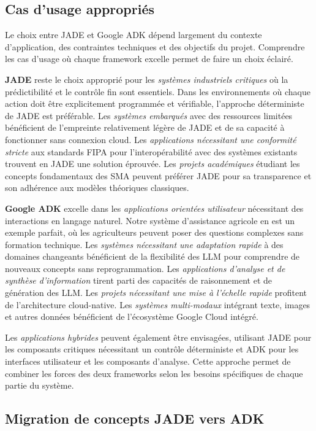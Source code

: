 \subsection{Cas d'usage appropriés}

Le choix entre JADE et Google ADK dépend largement du contexte d'application, des contraintes techniques et des objectifs du projet. Comprendre les cas d'usage où chaque framework excelle permet de faire un choix éclairé.

\textbf{JADE} reste le choix approprié pour les \emph{systèmes industriels critiques} où la prédictibilité et le contrôle fin sont essentiels. Dans les environnements où chaque action doit être explicitement programmée et vérifiable, l'approche déterministe de JADE est préférable. Les \emph{systèmes embarqués} avec des ressources limitées bénéficient de l'empreinte relativement légère de JADE et de sa capacité à fonctionner sans connexion cloud. Les \emph{applications nécessitant une conformité stricte} aux standards FIPA pour l'interopérabilité avec des systèmes existants trouvent en JADE une solution éprouvée. Les \emph{projets académiques} étudiant les concepts fondamentaux des SMA peuvent préférer JADE pour sa transparence et son adhérence aux modèles théoriques classiques.

\textbf{Google ADK} excelle dans les \emph{applications orientées utilisateur} nécessitant des interactions en langage naturel. Notre système d'assistance agricole en est un exemple parfait, où les agriculteurs peuvent poser des questions complexes sans formation technique. Les \emph{systèmes nécessitant une adaptation rapide} à des domaines changeants bénéficient de la flexibilité des LLM pour comprendre de nouveaux concepts sans reprogrammation. Les \emph{applications d'analyse et de synthèse d'information} tirent parti des capacités de raisonnement et de génération des LLM. Les \emph{projets nécessitant une mise à l'échelle rapide} profitent de l'architecture cloud-native. Les \emph{systèmes multi-modaux} intégrant texte, images et autres données bénéficient de l'écosystème Google Cloud intégré.

Les \emph{applications hybrides} peuvent également être envisagées, utilisant JADE pour les composants critiques nécessitant un contrôle déterministe et ADK pour les interfaces utilisateur et les composants d'analyse. Cette approche permet de combiner les forces des deux frameworks selon les besoins spécifiques de chaque partie du système.

\subsection{Migration de concepts JADE vers ADK}

